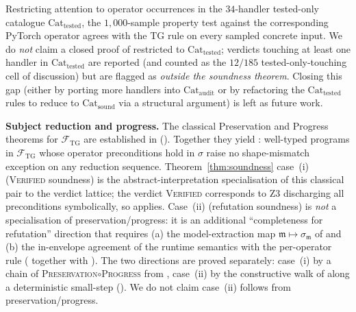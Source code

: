 \begin{conjecture}
\label{conj:tested-only-soundness}
Restricting attention to operator occurrences in the
$34$-handler tested-only catalogue
$\mathrm{Cat}_{\mathrm{tested}}$, the $1{,}000$-sample property
test against the corresponding PyTorch operator agrees with the
\textsc{TG} rule on every sampled concrete input. We do
\emph{not} claim a closed proof of  restricted
to $\mathrm{Cat}_{\mathrm{tested}}$; verdicts touching at least one
handler in $\mathrm{Cat}_{\mathrm{tested}}$ are reported (and
counted as the $12/185$ tested-only-touching cell of
 discussion) but are flagged as
\emph{outside the soundness theorem}. Closing this gap (either by
porting more handlers into $\mathrm{Cat}_{\mathrm{audit}}$ or by
refactoring the $\mathrm{Cat}_{\mathrm{tested}}$ rules to reduce
to $\mathrm{Cat}_{\mathrm{sound}}$ via a structural argument) is
left as future work.
\end{conjecture}

\smallskip\noindent\textbf{Subject reduction and progress.}
The classical Preservation and Progress theorems for $\mathcal{F}_{\mathrm{TG}}$
are established in 
().
Together they yield : well-typed programs in
$\mathcal{F}_{\mathrm{TG}}$ whose operator preconditions hold in $\sigma$ raise no
shape-mismatch exception on any reduction sequence.
Theorem~\ref{thm:soundness} case~(i) (\textsc{Verified} soundness) is the
abstract-interpretation specialisation of this classical pair to the
verdict lattice; the verdict \textsc{Verified} corresponds to Z3
discharging all preconditions symbolically, so
 applies.
Case~(ii) (refutation soundness) is \emph{not} a specialisation of
preservation/progress: it is an additional
``completeness for refutation'' direction that requires
(a) the model-extraction map $\mathfrak{m}\!\mapsto\!\sigma_{\mathfrak{m}}$
of  and (b) the in-envelope agreement of
the runtime semantics with the per-operator rule
( together with
). The two directions are proved separately:
case~(i) by a chain of
\textsc{Preservation}$\circ$\textsc{Progress} from
, case~(ii) by the
constructive walk of  along a
deterministic small-step (). We do not claim
case~(ii) follows from preservation/progress.

